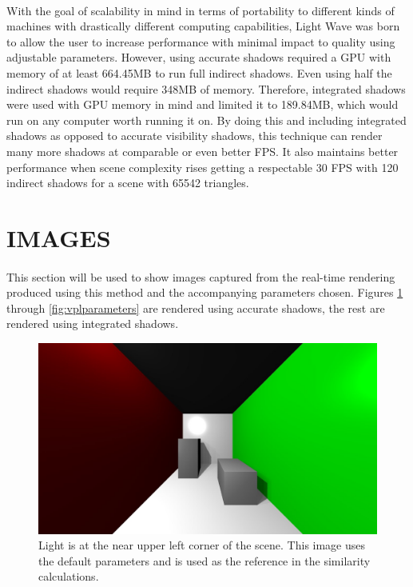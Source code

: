 \paragraph{}
With the goal of scalability in mind in terms of portability to different kinds of machines with drastically different computing capabilities, Light Wave was born to allow the user to increase performance with minimal impact to quality using adjustable parameters.  However, using accurate shadows required a GPU with memory of at least 664.45MB to run full indirect shadows. Even using half the indirect shadows would require 348MB of memory.  Therefore, integrated shadows were used with GPU memory in mind and limited it to 189.84MB, which would run on any computer worth running it on.  By doing this and including integrated shadows as opposed to accurate visibility shadows, this technique can render many more shadows at comparable or even better FPS.  It also maintains better performance when scene complexity rises getting a respectable 30 FPS with 120 indirect shadows for a scene with 65542 triangles.

\section{IMAGES}
\paragraph{}
This section will be used to show images captured from the real-time rendering produced using this method and the accompanying parameters chosen. Figures \ref{fig:defaultimage} through \ref{fig:vplparameters} are rendered using accurate shadows, the rest are rendered using integrated shadows.

\begin{figure}[h!]
  \centering
    \includegraphics[width=1.0\textwidth]{sample1.jpg}
  \caption{Light is at the near upper left corner of the scene. This image uses the default parameters and is used as the reference in the similarity calculations.}
	\label{fig:defaultimage}
\end{figure}


